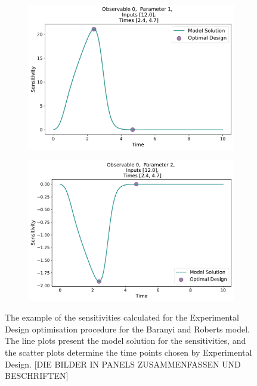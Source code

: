 \documentclass[10pt,A4paper]{article}
\begin{document}
\begin{figure}[H]
    \begin{subfigure}{.5\textwidth}
        \centering
        \includegraphics[scale=0.27]{Figures/Sensitivity_Results_baranyi_roberts_ode_fisher_determinant_rel_sensit_cont_2times_2temps_001_x_00_p_01.pdf}
        \subcaption{}
    \end{subfigure}
    \begin{subfigure}{.5\textwidth}
          \centering
          \includegraphics[scale=0.27]{Figures/Sensitivity_Results_baranyi_roberts_ode_fisher_determinant_rel_sensit_cont_2times_2temps_001_x_00_p_02.pdf}
          \subcaption{}
        \end{subfigure}
    \caption{{\footnotesize The example of the sensitivities calculated for the Experimental Design optimisation procedure for the Baranyi and Roberts model.
    The line plots present the model solution for the sensitivities, and the scatter plots determine the time points chosen by Experimental Design. [DIE BILDER IN PANELS ZUSAMMENFASSEN UND BESCHRIFTEN]}} 
    \label{fig:baranyi_roberts_sensitivities}
    \end{figure}
\end{document}
